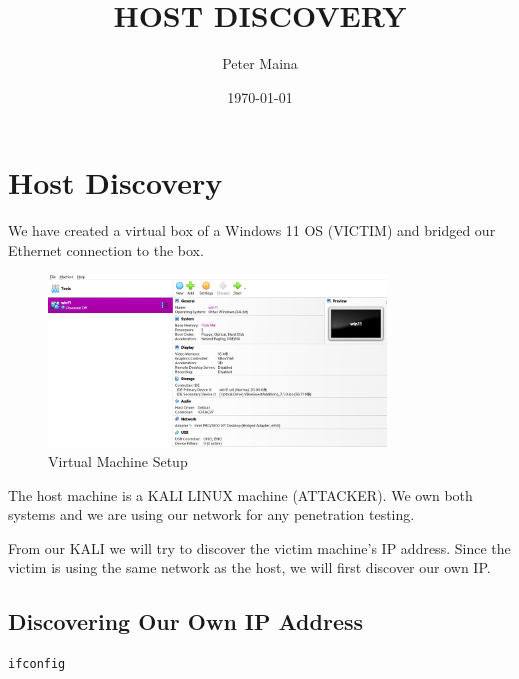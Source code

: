 \documentclass[a4paper,12pt]{article}
\title{HOST DISCOVERY}
\author{Peter Maina}
\date{\today}
\begin{document}
\maketitle

\section{Host Discovery}

We have created a virtual box of a Windows 11 OS (VICTIM) and bridged our Ethernet connection to the box.
\begin{figure}[h]
    \centering
    \includegraphics[width=0.8\textwidth]{vm.png}
    \caption{Virtual Machine Setup}
    \label{fig:vm_setup}
\end{figure}

The host machine is a KALI LINUX machine (ATTACKER). We own both systems and we are using our network for any penetration testing.

From our KALI we will try to discover the victim machine's IP address. Since the victim is using the same network as the host, we will first discover our own IP.

\subsection{Discovering Our Own IP Address}

\begin{verbatim}
ifconfig
\end{verbatim}
\end{document}
